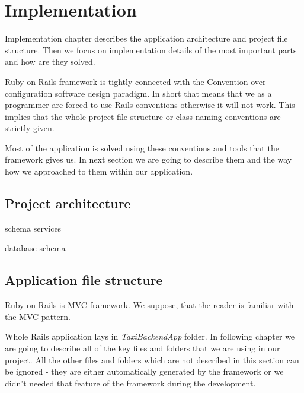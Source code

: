 \chapter{Implementation}
Implementation chapter describes the application architecture and project file structure. Then we focus on implementation details of the most important parts and how are they solved.

Ruby on Rails framework is tightly connected with the Convention over configuration software design paradigm. In short that means that we as a programmer are forced to use Rails conventions otherwise it will not work. This implies that the whole project file structure or class naming conventions are strictly given. 

Most of the application is solved using these conventions and tools that the framework gives us. In next section we are going to describe them and the way how we approached to them within our application.
\section{Project architecture}
schema services

database schema
\section {Application file structure}
	Ruby on Rails is MVC framework. We suppose, that the reader is familiar with the MVC  pattern.
	
	Whole Rails application lays in \textit{TaxiBackendApp} folder. In following chapter we are going to describe all of the key files and folders that we are using in our project. All the other files and folders which are not described in this section can be ignored - they are either automatically generated by the framework or we didn't needed that feature of the framework during the development.
	

